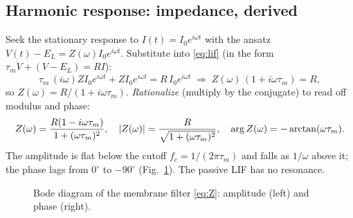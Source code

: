 \documentclass[11pt]{article}
\begin{document}
\subsection{Harmonic response: impedance, derived}
Seek the stationary response to $I(t)=I_0e^{i\omega t}$ with the ansatz $V(t)-E_L=Z(\omega)I_0
e^{i\omega t}$. Substitute into \eqref{eq:lif} (in the form $\tau_m\dot V+(V-E_L)=RI$):
\begin{equation}
  \tau_m\,(i\omega)Z I_0e^{i\omega t}+Z I_0e^{i\omega t}=R\,I_0e^{i\omega t}
  \;\Longrightarrow\;Z(\omega)\,(1+i\omega\tau_m)=R,
\end{equation}
so $Z(\omega)=R/(1+i\omega\tau_m)$. \emph{Rationalize} (multiply by the conjugate) to read off
modulus and phase:
\begin{equation}
  Z(\omega)=\frac{R(1-i\omega\tau_m)}{1+(\omega\tau_m)^2},\quad
  \lvert Z(\omega)\rvert=\frac{R}{\sqrt{1+(\omega\tau_m)^2}},\quad
  \arg Z(\omega)=-\arctan(\omega\tau_m).
  \label{eq:Z}
\end{equation}
The amplitude is flat below the cutoff $f_c=1/(2\pi\tau_m)$ and falls as $1/\omega$ above it; the
phase lags from $0^\circ$ to $-90^\circ$ (Fig.~\ref{fig:bode}). The passive LIF has no resonance.

\begin{figure}[h]
\centering
{}
\caption{Bode diagram of the membrane filter \eqref{eq:Z}: amplitude (left) and phase (right).}
\label{fig:bode}
\end{figure}

\end{document}

